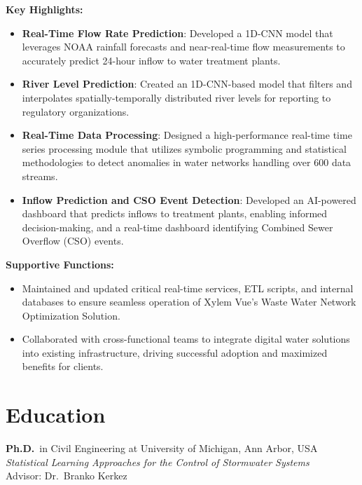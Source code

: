 \documentclass[a4paper,11pt]{article}
\newcommand{\years}[1]{%
  {\reversemarginpar\strut\marginnote{{\small#1}}}%
}
\begin{document}
\vspace{2mm}
{\small \textbf{Key Highlights:}}
\vspace{-2mm}
\begin{itemize}
	\setlength\itemsep{1mm}
	\item \textbf{Real-Time Flow Rate Prediction}: Developed a 1D-CNN model that
leverages NOAA rainfall forecasts and near-real-time flow measurements to accurately predict 24-hour inflow to water treatment plants.
	\item \textbf{River Level Prediction}: Created an 1D-CNN-based model that
filters and interpolates spatially-temporally distributed river levels for
reporting to regulatory organizations.
	\item \textbf{Real-Time Data Processing}: Designed a high-performance real-time time series processing module that utilizes symbolic programming and statistical methodologies
to detect anomalies in water networks handling over 600 data streams.
	\item \textbf{Inflow Prediction and CSO Event Detection}: Developed an AI-powered dashboard that predicts inflows to treatment plants, enabling informed decision-making, and a
real-time dashboard identifying Combined Sewer Overflow (CSO) events.
\end{itemize}

\vspace{1mm}
{\small \textbf{Supportive Functions:}}
\vspace{-2mm}
\begin{itemize}
	\setlength\itemsep{1mm}
	\item Maintained and updated critical real-time services, ETL scripts, and internal
databases to ensure seamless operation of Xylem Vue's Waste Water Network Optimization Solution.
\item Collaborated with cross-functional teams to integrate digital water solutions
into existing infrastructure, driving successful adoption and maximized benefits
for clients.
\end{itemize}

\section*{Education}

\years{2017--2020}%
\textbf{Ph.D.}\ in Civil Engineering at University of Michigan, Ann Arbor, USA\\[.1cm]
\noindent \emph{Statistical Learning Approaches for the Control of Stormwater Systems}\\
Advisor: Dr.\ Branko Kerkez\\[.1cm]
\end{document}
